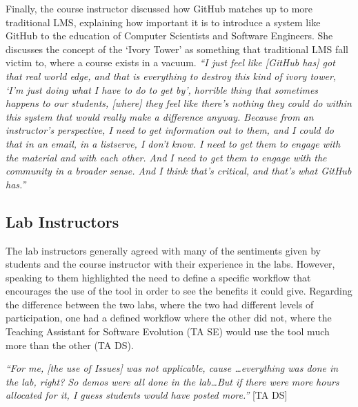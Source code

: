 Finally, the course instructor discussed how GitHub matches up to more traditional LMS, explaining how important it is to introduce a system like GitHub to the education of Computer Scientists and Software Engineers. She discusses the concept of the `Ivory Tower' as something that traditional LMS fall victim to, where a course exists in a vacuum. \textit{``I just feel like [GitHub has] got that real world edge, and that is everything to destroy this kind of ivory tower, `I'm just doing what I have to do to get by', horrible thing that sometimes happens to our students, [where] they feel like there's nothing they could do within this system that would really make a difference anyway. Because from an instructor's perspective, I need to get information out to them, and I could do that in an email, in a listserve, I don't know. I need to get them to engage with the material and with each other. And I need to get them to engage with the community in a broader sense. And I think that's critical, and that's what GitHub has.''}



\subsection{Lab Instructors}
The lab instructors generally agreed with many of the sentiments given by students and the course instructor with their experience in the labs. However, speaking to them highlighted the need to define a specific workflow that encourages the use of the tool in order to see the benefits it could give. Regarding the difference between the two labs, where the two had different levels of participation, one had a defined workflow where the other did not, where the Teaching Assistant for Software Evolution (TA SE) would use the tool much more than the other (TA DS).

\textit{``For me, [the use of Issues] was not applicable, cause \ldots everything was done in the lab, right? So demos were all done in the lab\ldots But if there were more hours allocated for it, I guess students would have posted more.''} [TA DS]

